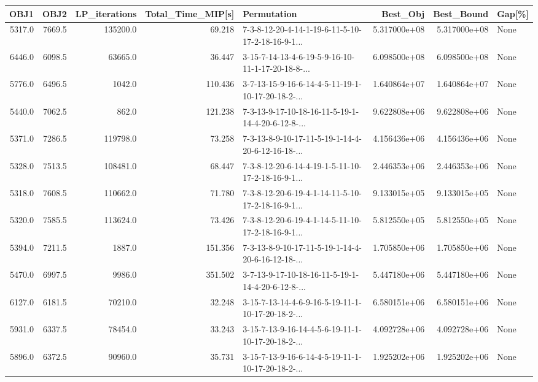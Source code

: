 \begin{tabular}{rrrrlrrl}
\toprule
   OBJ1 &    OBJ2 &  LP\_iterations &  Total\_Time\_MIP[s] &                                        Permutation &      Best\_Obj &    Best\_Bound & Gap[\%] \\
\midrule
 5317.0 &  7669.5 &       135200.0 &             69.218 &  7-3-8-12-20-4-14-1-19-6-11-5-10-17-2-18-16-9-1... &  5.317000e+08 &  5.317000e+08 &   None \\
 6446.0 &  6098.5 &        63665.0 &             36.447 &  3-15-7-14-13-4-6-19-5-9-16-10-11-1-17-20-18-8-... &  6.098500e+08 &  6.098500e+08 &   None \\
 5776.0 &  6496.5 &         1042.0 &            110.436 &  3-7-13-15-9-16-6-14-4-5-11-19-1-10-17-20-18-2-... &  1.640864e+07 &  1.640864e+07 &   None \\
 5440.0 &  7062.5 &          862.0 &            121.238 &  7-3-13-9-17-10-18-16-11-5-19-1-14-4-20-6-12-8-... &  9.622808e+06 &  9.622808e+06 &   None \\
 5371.0 &  7286.5 &       119798.0 &             73.258 &  7-3-13-8-9-10-17-11-5-19-1-14-4-20-6-12-16-18-... &  4.156436e+06 &  4.156436e+06 &   None \\
 5328.0 &  7513.5 &       108481.0 &             68.447 &  7-3-8-12-20-6-14-4-19-1-5-11-10-17-2-18-16-9-1... &  2.446353e+06 &  2.446353e+06 &   None \\
 5318.0 &  7608.5 &       110662.0 &             71.780 &  7-3-8-12-20-6-19-4-1-14-11-5-10-17-2-18-16-9-1... &  9.133015e+05 &  9.133015e+05 &   None \\
 5320.0 &  7585.5 &       113624.0 &             73.426 &  7-3-8-12-20-6-19-4-1-14-5-11-10-17-2-18-16-9-1... &  5.812550e+05 &  5.812550e+05 &   None \\
 5394.0 &  7211.5 &         1887.0 &            151.356 &  7-3-13-8-9-10-17-11-5-19-1-14-4-20-6-16-12-18-... &  1.705850e+06 &  1.705850e+06 &   None \\
 5470.0 &  6997.5 &         9986.0 &            351.502 &  3-7-13-9-17-10-18-16-11-5-19-1-14-4-20-6-12-8-... &  5.447180e+06 &  5.447180e+06 &   None \\
 6127.0 &  6181.5 &        70210.0 &             32.248 &  3-15-7-13-14-4-6-9-16-5-19-11-1-10-17-20-18-2-... &  6.580151e+06 &  6.580151e+06 &   None \\
 5931.0 &  6337.5 &        78454.0 &             33.243 &  3-15-7-13-9-16-14-4-5-6-19-11-1-10-17-20-18-2-... &  4.092728e+06 &  4.092728e+06 &   None \\
 5896.0 &  6372.5 &        90960.0 &             35.731 &  3-15-7-13-9-16-6-14-4-5-19-11-1-10-17-20-18-2-... &  1.925202e+06 &  1.925202e+06 &   None \\

\end{tabular}
